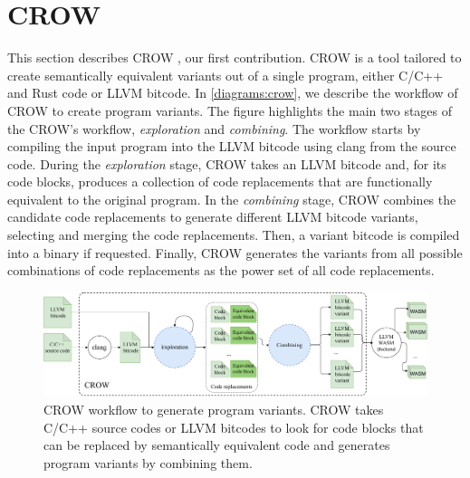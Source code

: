 
\section{CROW}
\label{section:crow}

This section describes CROW \cite{CROW}, our first contribution. CROW is a tool tailored to create semantically equivalent \wasm variants out of a single program, either C/C++ and Rust code or LLVM bitcode.
In \autoref{diagrams:crow}, we describe the workflow of CROW to create program variants.
The figure highlights the main two stages of the CROW's workflow, \textit{exploration} and \textit{combining}. The workflow starts by compiling the input program into the LLVM bitcode using clang from the source code. During the \emph{exploration} stage, CROW takes an LLVM bitcode and, for its code blocks, produces a collection of code replacements that are functionally equivalent to the original program. 
In the \emph{combining} stage, CROW combines the candidate code replacements to generate different LLVM bitcode variants, selecting and merging the code replacements. 
Then, a variant bitcode is compiled into a \wasm binary if requested. Finally, CROW generates the variants from all possible combinations of code replacements as the power set of all code replacements.  


\begin{figure}[h]
    \includegraphics[width=\linewidth]{diagrams/generation/crow.drawio.pdf}
    \caption{CROW workflow to generate program variants. CROW takes C/C++ source codes or LLVM bitcodes to look for code blocks that can be replaced by semantically equivalent code and generates program variants by combining them.}
    \label{diagrams:crow}
\end{figure}



